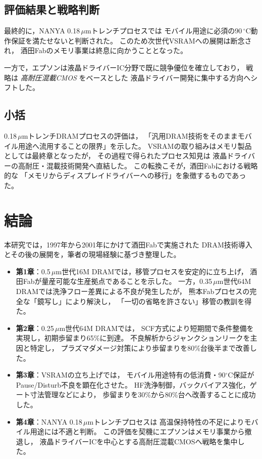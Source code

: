 \documentclass[conference]{IEEEtran}
\begin{document}
\subsection{評価結果と戦略判断}
最終的に，NANYA 0.18\,$\mu$mトレンチプロセスでは
モバイル用途に必須の90\,$^\circ$C動作保証を満たせないと判断された。
このため次世代VSRAMへの展開は断念され，
酒田Fabのメモリ事業は終息に向かうこととなった。

一方で，エプソンは液晶ドライバーIC分野で既に競争優位を確立しており，
戦略は \emph{高耐圧混載CMOS} をベースとした
液晶ドライバー開発に集中する方向へシフトした。

\subsection{小括}
0.18\,$\mu$mトレンチDRAMプロセスの評価は，
「汎用DRAM技術をそのままモバイル用途へ流用することの限界」を示した。
VSRAMの取り組みはメモリ製品としては最終章となったが，
その過程で得られたプロセス知見は
液晶ドライバーの高耐圧・混載技術開発へ直結した。
この転換こそが，酒田Fabにおける戦略的な
「メモリからディスプレイドライバーへの移行」を象徴するものであった。

\section{結論}

本研究では，1997年から2001年にかけて酒田Fabで実施された
DRAM技術導入とその後の展開を，筆者の現場経験に基づき整理した。

\begin{itemize}
  \item \textbf{第1章}：0.5\,$\mu$m世代16M DRAMでは，移管プロセスを安定的に立ち上げ，
        酒田Fabが量産可能な生産拠点であることを示した。
        一方，0.35\,$\mu$m世代64M DRAMでは洗浄フロー差異による不良が発生したが，
        熊本Fabプロセスの完全な「鏡写し」により解決し，
        「一切の省略を許さない」移管の教訓を得た。
  \item \textbf{第2章}：0.25\,$\mu$m世代64M DRAMでは，
        SCF方式により短期間で条件整備を実現し，初期歩留まり65\%に到達。
        不良解析からジャンクションリークを主因と特定し，
        プラズマダメージ対策により歩留まりを80\%台後半まで改善した。
  \item \textbf{第3章}：VSRAMの立ち上げでは，
        モバイル用途特有の低消費・90$^\circ$C保証が
        Pause/Disturb不良を顕在化させた。
        HF洗浄制御，バックバイアス強化，ゲート寸法管理などにより，
        歩留まりを30\%から80\%台へ改善することに成功した。
  \item \textbf{第4章}：NANYA 0.18\,$\mu$mトレンチプロセスは
        高温保持特性の不足によりモバイル用途には不適と判断。
        この評価を契機にエプソンはメモリ事業から撤退し，
        液晶ドライバーICを中心とする高耐圧混載CMOSへ戦略を集中した。
\end{itemize}
\end{document}
